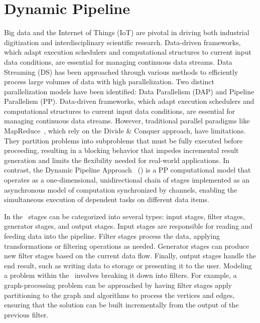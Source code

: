 \section{Dynamic Pipeline}
Big data and the Internet of Things (IoT) are pivotal in driving both industrial
digitization and interdisciplinary scientific research. Data-driven frameworks, 
which adapt execution schedulers and computational structures to current input 
data conditions, are essential for managing continuous data streams. Data 
Streaming (DS) has been approached through various methods to efficiently process
large volumes of data with high parallelization. Two distinct parallelization 
models have been identified: Data Parallelism (DAP) and Pipeline Parallelism (PP).
Data-driven frameworks, which adapt execution schedulers and computational 
structures to current input data conditions, are essential for managing continuous
data streams. However, traditional parallel paradigms like 
MapReduce~\cite{Dean2008,Karloff2010}, which rely on the Divide \& Conquer 
approach, have limitations. They partition problems into subproblems that must be
fully executed before proceeding, resulting in a blocking behavior that impedes 
incremental result generation and limits the flexibility needed for real-world 
applications. In contrast, the Dynamic Pipeline Approach~\cite{Zoltan2019,Pasarella2024}
(\dpm) is a PP computational model that operates as a one-dimensional, 
unidirectional chain of stages implemented as an asynchronous model of computation
synchronized by channels, enabling the simultaneous execution of dependent tasks
on different data items.

In the \dpm\, stages can be categorized into several types: input stages, filter stages, generator stages, and output stages. Input stages are responsible for reading and feeding data into the pipeline. Filter stages process the data, applying transformations or filtering operations as needed. Generator stages can produce new filter stages based on the current data flow. Finally, output stages handle the end result, such as writing data to storage or presenting it to the user. Modeling a problem within the \dpm\ involves breaking it down into filters. For example, a graph-processing problem can be approached by having filter stages apply partitioning to the graph and algorithms to process the vertices and edges, ensuring that the solution can be built incrementally from the output of the previous filter.


